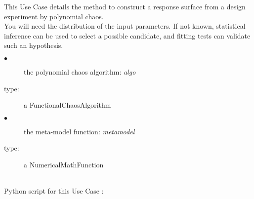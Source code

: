 \renewcommand{\filename}{docUC_RespSurface_Polynomial_database.tex}
\renewcommand{\filetitle}{UC : Polynomial chaos approximation from a design experiment}

\HeaderIIILevel

\label{krigingApprox}


This Use Case details the method to construct a response surface from a design experiment by polynomial chaos.\\
You will need the distribution of the input parameters. If not known, statistical inference can be used to select a possible candidate,
and fitting tests can validate such an hypothesis.

{
  \begin{description}
  \item[$\bullet$] the polynomial chaos algorithm: {\itshape algo}
  \item[type:] a FunctionalChaosAlgorithm
  \item[$\bullet$] the meta-model function: {\itshape metamodel}
  \item[type:] a NumericalMathFunction
  \end{description}
}

\textspace\\
Python script for this Use Case :


